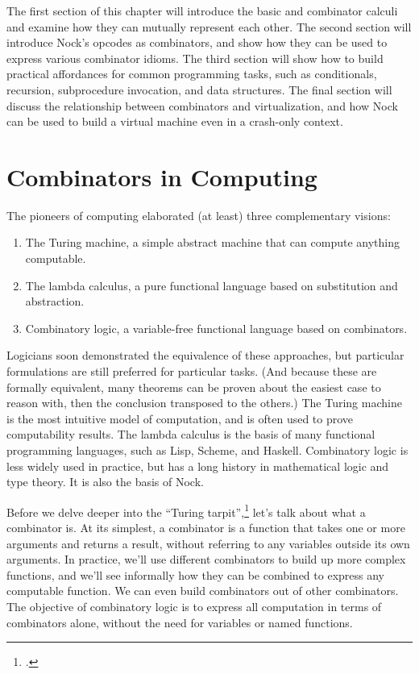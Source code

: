 The first section of this chapter will introduce the basic  and  combinator calculi and examine how they can mutually represent each other.  The second section will introduce Nock's opcodes as combinators, and show how they can be used to express various combinator idioms.  The third section will show how to build practical affordances for common programming tasks, such as conditionals, recursion, subprocedure invocation, and data structures.  The final section will discuss the relationship between combinators and virtualization, and how Nock can be used to build a virtual machine even in a crash-only context.

\section{Combinators in Computing}

The pioneers of computing elaborated (at least) three complementary visions:

\begin{enumerate}
  \item  The Turing machine, a simple abstract machine that can compute anything computable.
  \item  The lambda calculus, a pure functional language based on substitution and abstraction.
  \item  Combinatory logic, a variable-free functional language based on combinators.
\end{enumerate}

Logicians soon demonstrated the equivalence of these approaches, but particular formulations are still preferred for particular tasks.  (And because these are formally equivalent, many theorems can be proven about the easiest case to reason with, then the conclusion transposed to the others.)  The Turing machine is the most intuitive model of computation, and is often used to prove computability results.  The lambda calculus is the basis of many functional programming languages, such as Lisp, Scheme, and Haskell.  Combinatory logic is less widely used in practice, but has a long history in mathematical logic and type theory.  It is also the basis of Nock.

Before we delve deeper into the ``Turing tarpit'',\footnote{\citet{Perlis1982}.} let's talk about what a combinator is.  At its simplest, a combinator is a function that takes one or more arguments and returns a result, without referring to any variables outside its own arguments.  In practice, we'll use different combinators to build up more complex functions, and we'll see informally how they can be combined to express any computable function.  We can even build combinators out of other combinators.  The objective of combinatory logic is to express all computation in terms of combinators alone, without the need for variables or named functions.


